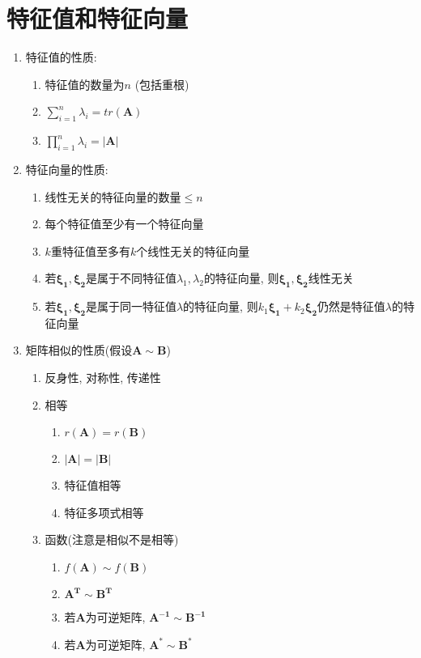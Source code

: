 \chapter{特征值和特征向量}
\begin{enumerate}
\item 特征值的性质:
\begin{enumerate}
\item 特征值的数量为$n$ (包括重根)
\item $\sum_{i=1}^{n}\lambda_{i}=tr(\bm{A})$
\item $\prod_{i=1}^{n}\lambda_{i}=|\bm{A}|$
\end{enumerate}
\item 特征向量的性质:
\begin{enumerate}
\item 线性无关的特征向量的数量$\le n$
\item 每个特征值至少有一个特征向量
\item $k$重特征值至多有$k$个线性无关的特征向量
\item 若$\bm{\xi_{1}},\bm{\xi_{2}}$是属于不同特征值$\lambda_{1},\lambda_{2}$的特征向量, 则$\bm{\xi_{1}},\bm{\xi_{2}}$线性无关
\item 若$\bm{\xi_{1}},\bm{\xi_{2}}$是属于同一特征值$\lambda$的特征向量, 则$k_{1}\bm{\xi_{1}}+k_{2}\bm{\xi_{2}}$仍然是特征值$\lambda$的特征向量
\end{enumerate}
\item 矩阵相似的性质(假设$\bm{A}\sim \bm{B}$)
\begin{enumerate}
\item 反身性, 对称性, 传递性
\item 相等
\begin{enumerate}
\item $r(\bm{A})=r(\bm{B})$
\item $|\bm{A}|=|\bm{B}|$
\item 特征值相等
\item 特征多项式相等
\end{enumerate}
\item 函数(注意是相似不是相等)
\begin{enumerate}
\item $f(\bm{A})\sim f(\bm{B})$
\item $\bm{A^{T}}\sim \bm{B^{T}}$
\item 若$\bm{A}$为可逆矩阵, $\bm{A^{-1}}\sim \bm{B^{-1}}$
\item 若$\bm{A}$为可逆矩阵, $\bm{A^{*}}\sim \bm{B^{*}}$
\end{enumerate}
\end{enumerate}

\end{enumerate}
